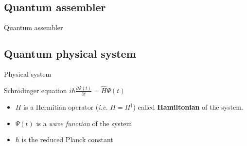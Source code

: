 \subsection{Quantum assembler}
\begin{frame}[fragile]{Quantum assembler}
	
\end{frame}
\subsection{Quantum physical system}
\begin{frame}{Physical system}
\begin{block}{Schr\"odinger equation}
	\centering
	\huge
	$i \hbar \frac{\partial \Psi(t)}{\partial t} = \hat H \Psi(t)$
\end{block}
\vspace{1cm}
\begin{itemize}
\item  $H$ is a Hermitian operator (\textit{i.e.} $H=H^\dagger$) called
	\textbf{Hamiltonian} of the system. 
\item  $\Psi(t)$ is a \textit{wave function} of the system
\item $\hbar$ is the reduced Planck constant
\end{itemize}	
\end{frame}


